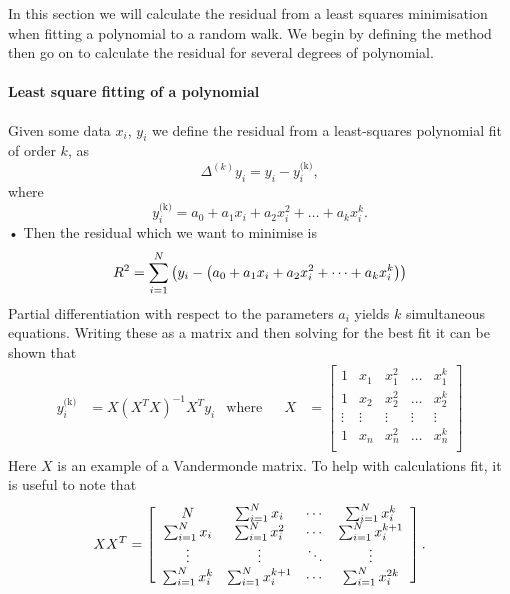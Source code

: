In this section we will calculate the residual from a least squares minimisation
when fitting a polynomial to a random walk. We begin by defining the method then
go on to calculate the residual for several degrees of polynomial.

\paragraph{Least square fitting of a polynomial}

Given some data $x_{i}$, $y_{i}$ we define the residual from a least-squares 
polynomial fit of order $k$, as
\begin{equation}
    \Delta^{(k)}y_{i} = y_{i} - y^{\textrm{(k)}}_{i},
\end{equation}
where
\begin{equation}
y^{\textrm{(k)}}_{i} = a_{0} + a_{1}x_{i} + a_{2}x_{i}^{2} + \dots 
                                                           + a_{k} x_{i}^{k}.
\end{equation}•
Then the residual which we want to minimise is
\begin{equation}
R^{2} = \sum_{i=1}^{N}\left(y_{i} - \left(a_{0} + a_{1}x_{i} + a_{2}x_{i}^{2} + 
        \dots + a_{k} x_{i}^{k}\right)\right)
\end{equation}
Partial differentiation with respect to the parameters $a_{i}$ yields $k$
simultaneous equations. Writing these as a matrix and then solving 
for the best fit it can be shown \citep{WolframLeastSquares} that
\begin{align}
y^{\textrm{(k)}}_{i} & = X \left(X^{T}X\right)^{-1} X^{T} y_{i} & \textrm{where} & &
X & = \left[\begin{array}{ccccc}
1 & x_{1} & x_{1}^{2} & \dots & x_{1}^{k} \\
1 & x_{2} & x_{2}^{2} & \dots & x_{2}^{k} \\
\vdots & \vdots & \vdots & \vdots & \vdots \\
1 & x_{n} & x_{n}^{2} & \dots & x_{n}^{k} \\
\end{array}\right]
\end{align}
Here $X$ is an example of a Vandermonde matrix. To help with calculations
fit, it is useful to note that
\begin{equation}
XX^{T} = \left[\begin{array}{cccc}
N & \sum_{i=1}^{N}x_{i} & \cdots &  \sum_{i=1}^{N}x_{i}^{k} \\ 
\sum_{i=1}^{N}x_{i} & \sum_{i=1}^{N}x_{i}^{2} & \cdots &  \sum_{i=1}^{N}x_{i}^{k+1} \\
\vdots & \vdots & \ddots & \vdots \\
\sum_{i=1}^{N}x_{i}^{k} & \sum_{i=1}^{N}x_{i}^{k+1} & \cdots &  \sum_{i=1}^{N}x_{i}^{2k}
\end{array}\right].
\end{equation}

